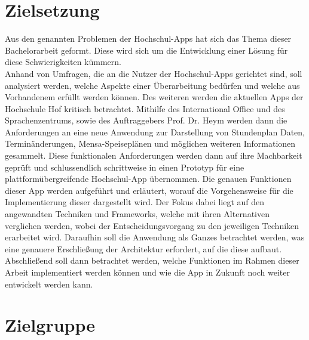\section{Zielsetzung}

Aus den genannten Problemen der Hochschul-\acp{App} hat sich das Thema dieser Bachelorarbeit geformt. Diese wird sich um die Entwicklung einer Lösung für diese Schwierigkeiten kümmern. 
\\
\linebreak
Anhand von Umfragen, die an die Nutzer der Hochschul-\acp{App} gerichtet sind, soll analysiert werden, welche Aspekte einer Überarbeitung bedürfen und welche aus Vorhandenem erfüllt werden können. Des weiteren werden die aktuellen \acp{App} der Hochschule Hof kritisch betrachtet. Mithilfe des International Office und des Sprachenzentrums, sowie des Auftraggebers Prof. Dr. Heym werden dann die Anforderungen an eine neue Anwendung zur Darstellung von Stundenplan Daten, Terminänderungen, Mensa-Speiseplänen und möglichen weiteren Informationen gesammelt. Diese funktionalen Anforderungen werden dann auf ihre Machbarkeit geprüft und schlussendlich schrittweise in einen Prototyp für eine plattformübergreifende Hochschul-\ac{App} übernommen. Die genauen Funktionen dieser \ac{App} werden aufgeführt und erläutert, worauf die Vorgehensweise für die Implementierung dieser dargestellt wird. Der Fokus dabei liegt auf den angewandten Techniken und Frameworks, welche mit ihren Alternativen verglichen werden, wobei der Entscheidungsvorgang zu den jeweiligen Techniken erarbeitet wird. Daraufhin soll die Anwendung als Ganzes betrachtet werden, was eine genauere Erschließung der Architektur erfordert, auf die diese aufbaut. Abschließend soll dann betrachtet werden, welche Funktionen im Rahmen dieser Arbeit implementiert werden können und wie die \ac{App} in Zukunft noch weiter entwickelt werden kann.

\section{Zielgruppe}

